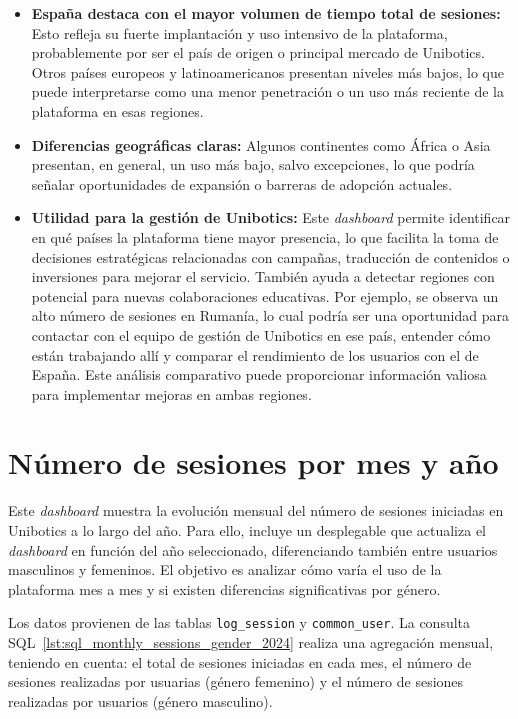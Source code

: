 \documentclass[a4paper, 12pt]{book}
\begin{document}
\begin{itemize}
  \item \textbf{España destaca con el mayor volumen de tiempo total de sesiones:} Esto refleja su fuerte implantación y uso intensivo de la plataforma, probablemente por ser el país de origen o principal mercado de Unibotics. Otros países europeos y latinoamericanos presentan niveles más bajos, lo que puede interpretarse como una menor penetración o un uso más reciente de la plataforma en esas regiones.

  \item \textbf{Diferencias geográficas claras:} Algunos continentes como África o Asia presentan, en general, un uso más bajo, salvo excepciones, lo que podría señalar oportunidades de expansión o barreras de adopción actuales.

  \item \textbf{Utilidad para la gestión de Unibotics:} Este \textit{dashboard} permite identificar en qué países la plataforma tiene mayor presencia, lo que facilita la toma de decisiones estratégicas relacionadas con campañas, traducción de contenidos o inversiones para mejorar el servicio. También ayuda a detectar regiones con potencial para nuevas colaboraciones educativas. Por ejemplo, se observa un alto número de sesiones en Rumanía, lo cual podría ser una oportunidad para contactar con el equipo de gestión de Unibotics en ese país, entender cómo están trabajando allí y comparar el rendimiento de los usuarios con el de España. Este análisis comparativo puede proporcionar información valiosa para implementar mejoras en ambas regiones.
\end{itemize}

\section{Número de sesiones por mes y año}
\label{sec:dash2c}

Este \textit{dashboard} muestra la evolución mensual del número de sesiones iniciadas en Unibotics a lo largo del año. Para ello, incluye un desplegable que actualiza el \textit{dashboard} en función del año seleccionado, diferenciando también entre usuarios masculinos y femeninos. El objetivo es analizar cómo varía el uso de la plataforma mes a mes y si existen diferencias significativas por género.

Los datos provienen de las tablas \texttt{log\_session} y \texttt{common\_user}. La consulta SQL~\ref{lst:sql_monthly_sessions_gender_2024} realiza una agregación mensual, teniendo en cuenta: el total de sesiones iniciadas en cada mes, el número de sesiones realizadas por usuarias (género femenino) y el número de sesiones realizadas por usuarios (género masculino).
\end{document}
